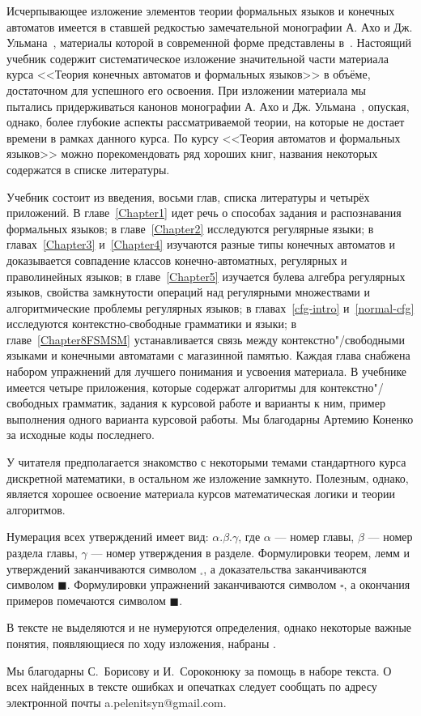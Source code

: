 Исчерпывающее изложение элементов теории формальных языков и конечных автоматов имеется в ставшей редкостью замечательной монографии А. Ахо и Дж. Ульмана~\cite{AU}, материалы которой в современной форме представлены в~\cite{Hop}. Настоящий учебник содержит систематическое изложение значительной части материала курса <<Теория конечных автоматов и формальных языков>> в объёме, достаточном для успешного его освоения. При изложении материала мы пытались придерживаться канонов монографии А. Ахо и Дж. Ульмана~\cite{AU}, опуская, однако, более глубокие аспекты рассматриваемой теории, на которые не достает времени в рамках данного курса. По курсу <<Теория автоматов и формальных языков>> можно порекомендовать ряд хороших книг, названия некоторых содержатся в списке литературы. 

Учебник состоит из введения, восьми глав, списка литературы и четырёх приложений. В главе~\ref{Chapter1} идет речь о способах задания и распознавания формальных языков; в главе~\ref{Chapter2} исследуются регулярные языки; в главах~\ref{Chapter3} и~\ref{Chapter4} изучаются разные типы конечных автоматов и доказывается совпадение классов конечно-автоматных, регулярных и праволинейных языков; в главе~\ref{Chapter5} изучается булева алгебра регулярных языков, свойства замкнутости операций над регулярными множествами и алгоритмические проблемы регулярных языков; в главах~\ref{cfg-intro} и~\ref{normal-cfg} исследуются контекстно-свободные грамматики и языки; в главе~\ref{Chapter8FSMSM} устанавливается связь между контекстно"/свободными языками и конечными автоматами с магазинной памятью. Каждая глава снабжена набором упражнений для лучшего понимания и усвоения материала. В учебнике имеется четыре приложения, которые содержат алгоритмы для контекстно"/свободных грамматик, задания к курсовой работе и варианты к ним, пример выполнения одного варианта курсовой работы. Мы благодарны Артемию Коненко за исходные коды последнего.

У читателя предполагается знакомство с некоторыми темами стандартного курса дискретной математики, в остальном же изложение замкнуто. Полезным, однако, является хорошее освоение материала курсов математическая логики и теории алгоритмов.

Нумерация всех утверждений имеет вид: $\alpha.\beta.\gamma$, где $\alpha$ --- номер главы, $\beta$ --- номер раздела главы, $\gamma$ --- номер утверждения в разделе. Формулировки теорем, лемм и утверждений заканчиваются символом $_\square$, а доказательства заканчиваются символом $\blacksquare$. Формулировки упражнений заканчиваются символом $\square$, а окончания примеров помечаются символом $\blacksquare$.

В тексте не выделяются и не нумеруются определения, однако некоторые важные понятия, появляющиеся по ходу изложения, набраны .

Мы благодарны С.~Борисову и И.~Сороконюку за помощь в наборе текста. О всех найденных в тексте ошибках и опечатках следует сообщать по адресу электронной почты a.pelenitsyn@gmail.com.
